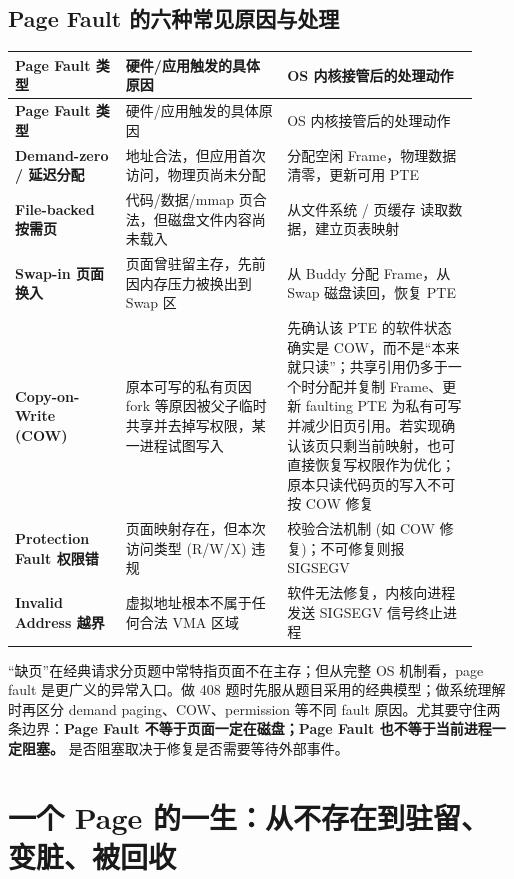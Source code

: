 \documentclass[11pt,a4paper]{ctexart}
\newcommand{\kw}[1]{\textbf{#1}}
\begin{document}
\subsection{Page Fault 的六种常见原因与处理}
\begingroup
\small
\renewcommand{\arraystretch}{1.25}
\begin{longtable}{>{\bfseries}p{0.22\linewidth} p{0.32\linewidth} p{0.38\linewidth}}
\toprule
Page Fault 类型 & 硬件/应用触发的具体原因 & OS 内核接管后的处理动作\\
\midrule
\endfirsthead
\toprule
Page Fault 类型 & 硬件/应用触发的具体原因 & OS 内核接管后的处理动作\\
\midrule
\endhead
Demand-zero / 延迟分配 & 地址合法，但应用首次访问，物理页尚未分配 & 分配空闲 Frame，物理数据清零，更新可用 PTE\\
File-backed 按需页 & 代码/数据/mmap 页合法，但磁盘文件内容尚未载入 & 从文件系统 / 页缓存 读取数据，建立页表映射\\
Swap-in 页面换入 & 页面曾驻留主存，先前因内存压力被换出到 Swap 区 & 从 Buddy 分配 Frame，从 Swap 磁盘读回，恢复 PTE\\
Copy-on-Write (COW) & 原本可写的私有页因 fork 等原因被父子临时共享并去掉写权限，某一进程试图写入 & 先确认该 PTE 的软件状态确实是 COW，而不是“本来就只读”；共享引用仍多于一个时分配并复制 Frame、更新 faulting PTE 为私有可写并减少旧页引用。若实现确认该页只剩当前映射，也可直接恢复写权限作为优化；原本只读代码页的写入不可按 COW 修复\\ 
Protection Fault 权限错 & 页面映射存在，但本次访问类型 (R/W/X) 违规 & 校验合法机制 (如 COW 修复)；不可修复则报 SIGSEGV\\
Invalid Address 越界 & 虚拟地址根本不属于任何合法 VMA 区域 & 软件无法修复，内核向进程发送 SIGSEGV 信号终止进程\\
\bottomrule
\end{longtable}
\endgroup

\begin{exam}
“缺页”在经典请求分页题中常特指页面不在主存；但从完整 OS 机制看，page fault 是更广义的异常入口。做 408 题时先服从题目采用的经典模型；做系统理解时再区分 demand paging、COW、permission 等不同 fault 原因。尤其要守住两条边界：\kw{Page Fault 不等于页面一定在磁盘；Page Fault 也不等于当前进程一定阻塞。} 是否阻塞取决于修复是否需要等待外部事件。
\end{exam}

\section{一个 Page 的一生：从不存在到驻留、变脏、被回收}
\end{document}
